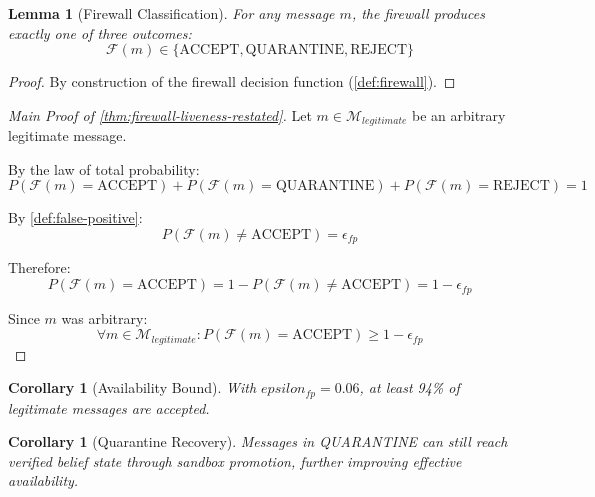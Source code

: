 \documentclass[
]{article}
\newtheorem{lemma}[theorem]{Lemma}
\newtheorem{corollary}[theorem]{Corollary}
\begin{document}
\begin{lemma}[Firewall Classification]
\label{lem:firewall-classification}
For any message $m$, the firewall produces exactly one of three outcomes:
\begin{equation}
\label{eq:firewall-outcomes}
\mathcal{F}(m) \in \{\text{ACCEPT}, \text{QUARANTINE}, \text{REJECT}\}
\end{equation}
\end{lemma}

\begin{proof}
By construction of the firewall decision function (\cref{def:firewall}).
\end{proof}

\begin{proof}[Main Proof of \cref{thm:firewall-liveness-restated}]
Let $m \in \mathcal{M}_{legitimate}$ be an arbitrary legitimate message.

By the law of total probability:
\begin{equation}
\label{eq:64-proof-1}
P(\mathcal{F}(m) = \text{ACCEPT}) + P(\mathcal{F}(m) = \text{QUARANTINE}) + P(\mathcal{F}(m) = \text{REJECT}) = 1
\end{equation}

By \cref{def:false-positive}:
\begin{equation}
\label{eq:64-proof-2}
P(\mathcal{F}(m) \neq \text{ACCEPT}) = \epsilon_{fp}
\end{equation}

Therefore:
\begin{equation}
\label{eq:64-proof-3}
P(\mathcal{F}(m) = \text{ACCEPT}) = 1 - P(\mathcal{F}(m) \neq \text{ACCEPT}) = 1 - \epsilon_{fp}
\end{equation}

Since $m$ was arbitrary:
\begin{equation}
\label{eq:64-proof-4}
\forall m \in \mathcal{M}_{legitimate}: P(\mathcal{F}(m) = \text{ACCEPT}) \geq 1 - \epsilon_{fp}
\end{equation}
\end{proof}

\begin{corollary}[Availability Bound]
\label{cor:availability}
With $epsilon_{fp} = 0.06$, at least 94\% of legitimate messages are accepted.
\end{corollary}

\begin{corollary}[Quarantine Recovery]
\label{cor:quarantine-recovery}
Messages in QUARANTINE can still reach verified belief state through sandbox promotion, further improving effective availability.
\end{corollary}
\end{document}
